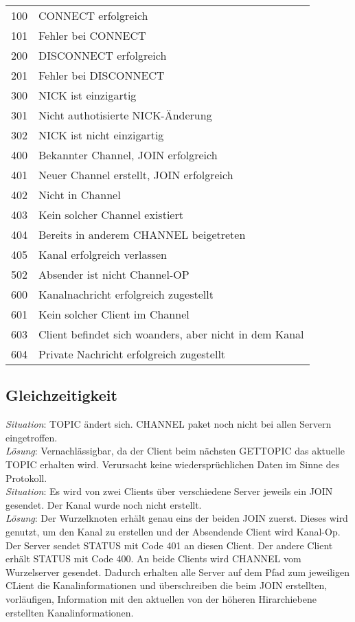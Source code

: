 \documentclass{article}
\begin{document}
\begin{tabular}{rl}
  100 & CONNECT erfolgreich \\
  101 & Fehler bei CONNECT \\
  200 & DISCONNECT erfolgreich \\
  201 & Fehler bei DISCONNECT \\
  300 & NICK ist einzigartig \\
  301 & Nicht authotisierte NICK-Änderung \\
  302 & NICK ist nicht einzigartig \\
  400 & Bekannter Channel, JOIN erfolgreich \\
  401 & Neuer Channel erstellt, JOIN erfolgreich \\
  402 & Nicht in Channel \\
  403 & Kein solcher Channel existiert \\
  404 & Bereits in anderem CHANNEL beigetreten \\
  405 & Kanal erfolgreich verlassen \\
  502 & Absender ist nicht Channel-OP \\
  600 & Kanalnachricht erfolgreich zugestellt \\
  601 & Kein solcher Client im Channel \\
  603 & Client befindet sich woanders, aber nicht in dem Kanal \\
  604 & Private Nachricht erfolgreich zugestellt \\
\end{tabular}

\subsection{Gleichzeitigkeit}

\emph{Situation}: TOPIC ändert sich. CHANNEL paket noch nicht bei allen Servern eingetroffen.\\
\emph{Lösung}: Vernachlässigbar, da der Client beim nächsten GETTOPIC das aktuelle TOPIC erhalten wird. Verursacht keine wiedersprüchlichen Daten im Sinne des Protokoll.\\

\emph{Situation}: Es wird von zwei Clients über verschiedene Server jeweils ein JOIN gesendet. Der Kanal wurde noch  nicht erstellt.\\
\emph{Lösung}: Der Wurzelknoten erhält genau eins der beiden JOIN zuerst. Dieses wird genutzt, um den Kanal zu erstellen und der Absendende Client wird Kanal-Op. Der Server sendet STATUS mit Code 401 an diesen Client. Der andere Client erhält STATUS mit Code 400. An beide Clients wird CHANNEL vom Wurzelserver gesendet. Dadurch erhalten alle Server auf dem Pfad zum jeweiligen CLient die Kanalinformationen und überschreiben die beim JOIN erstellten, vorläufigen, Information mit den aktuellen von der höheren Hirarchiebene erstellten Kanalinformationen.
\end{document}
